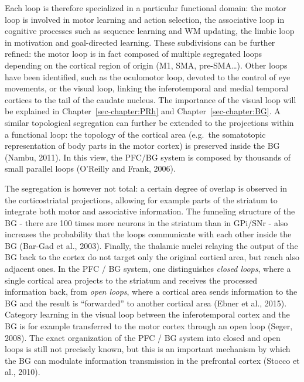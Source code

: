 \documentclass[
  11pt,
  a4paper,
]{scrbook}
\begin{document}
Each loop is therefore specialized in a particular functional domain:
the motor loop is involved in motor learning and action selection, the
associative loop in cognitive processes such as sequence learning and WM
updating, the limbic loop in motivation and goal-directed learning.
These subdivisions can be further refined: the motor loop is in fact
composed of multiple segregated loops depending on the cortical region
of origin (M1, SMA, pre-SMA\ldots). Other loops have been identified,
such as the oculomotor loop, devoted to the control of eye movements, or
the visual loop, linking the inferotemporal and medial temporal cortices
to the tail of the caudate nucleus. The importance of the visual loop
will be explained in Chapter~\ref{sec-chapter:PRh} and
Chapter~\ref{sec-chapter:BG}. A similar topological segregation can
further be extended to the projections within a functional loop: the
topology of the cortical area (e.g.~the somatotopic representation of
body parts in the motor cortex) is preserved inside the BG (Nambu,
2011). In this view, the PFC/BG system is composed by thousands of small
parallel loops (O'Reilly and Frank, 2006).

The segregation is however not total: a certain degree of overlap is
observed in the corticostriatal projections, allowing for example parts
of the striatum to integrate both motor and associative information. The
funneling structure of the BG - there are 100 times more neurons in the
striatum than in GPi/SNr - also increases the probability that the loops
communicate with each other inside the BG (Bar-Gad et al., 2003).
Finally, the thalamic nuclei relaying the output of the BG back to the
cortex do not target only the original cortical area, but reach also
adjacent ones. In the PFC / BG system, one distinguishes \emph{closed
loops}, where a single cortical area projects to the striatum and
receives the processed information back, from \emph{open loops}, where a
cortical area sends information to the BG and the result is
``forwarded'' to another cortical area (Ebner et al., 2015). Category
learning in the visual loop between the inferotemporal cortex and the BG
is for example transferred to the motor cortex through an open loop
(Seger, 2008). The exact organization of the PFC / BG system into closed
and open loops is still not precisely known, but this is an important
mechanism by which the BG can modulate information transmission in the
prefrontal cortex (Stocco et al., 2010).
\end{document}
